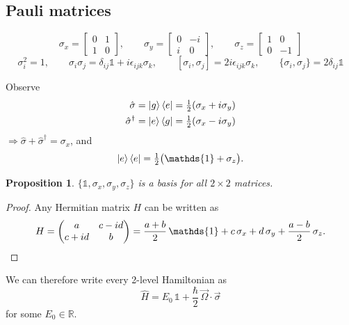 \documentclass[12pt]{article}
\theoremstyle{plain}
\newtheorem*{proposition*}{Proposition}
\theoremstyle{remark}
\newcommand{\I}{\mathds{1}}
\newcommand{\R}{\mathbb{R}}
\newcommand{\vecb}[1]{\vec{#1}}
\newcommand{\Om}{\vecb{\Omega}}
\newcommand{\sig}{\vecb{\sigma}}
\begin{document}
\subsection{Pauli matrices}

\[
  \sigma_x = \begin{bmatrix} 0 & 1 \\ 1 & 0 \end{bmatrix}, \qquad
  \sigma_y = \begin{bmatrix} 0 & -i \\ i & 0 \end{bmatrix}, \qquad
  \sigma_z = \begin{bmatrix} 1 & 0 \\ 0 & -1 \end{bmatrix}
\]
\[
  \sigma_i^2 = 1, \qquad
  \sigma_i\sigma_j = \delta_{ij}\I + i\epsilon_{ijk}\sigma_k, \qquad
  [\sigma_i, \sigma_j] = 2i\epsilon_{ijk}\sigma_k, \qquad
  \{\sigma_i, \sigma_j\} = 2\delta_{ij}\I
\]

Observe
\begin{align*}
  \hat\sigma   &= \ket{g}\bra{e} = \tfrac12(\sigma_x + i\sigma_y) \\
  \hat\sigma^\dagger &= \ket{e}\bra{g} = \tfrac12(\sigma_x - i\sigma_y)
\end{align*}
$\Rightarrow \hat\sigma + \hat\sigma^\dagger = \sigma_x$, and
\[
  \ket{e}\bra{e} = \tfrac12\bigl(\I + \sigma_z\bigr) .
\]

\begin{proposition*}
$\{\I, \sigma_x, \sigma_y, \sigma_z\}$ is a basis for all $2\times2$ matrices.
\end{proposition*}
\begin{proof}
Any Hermitian matrix $H$ can be written as
\[
  H = \begin{pmatrix} a & c - id \\ c + id & b \end{pmatrix}
    = \frac{a+b}{2}\,\I + c\,\sigma_x + d\,\sigma_y + \frac{a-b}{2}\,\sigma_z . \qedhere
\]
\end{proof}

We can therefore write every 2-level Hamiltonian as
\[
  \boxed{\; \hat H = E_0\,\I + \frac{\hbar}{2}\,\Om\cdot\sig \;}
\]
for some $E_0 \in \R$.
\end{document}
